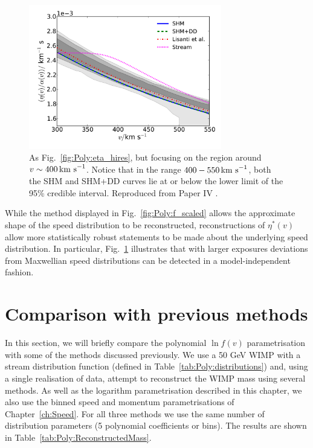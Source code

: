 \begin{figure}[t]
\centering
  \includegraphics[width=0.75\textwidth]{Poly/LIS_hires_zoom.pdf}
  \caption[As Fig.~\ref{fig:Poly:eta_hires}, but focusing on the region around $v \sim 400 \kms$]{As Fig.~\ref{fig:Poly:eta_hires}, but focusing on the region around $v \sim 400 \kms$. Notice that in the range $400-550 \,\textrm{km s}^{-1}$, both the SHM and SHM+DD curves lie at or below the lower limit of the 95\% credible interval. Reproduced from Paper IV \cite{Kavanagh:2014}.}
  \label{fig:Poly:eta_hires_zoom}
\end{figure}

While the method displayed in Fig.~\ref{fig:Poly:f_scaled} allows the approximate shape of the speed distribution to be reconstructed, reconstructions of $\eta^*(v)$ allow more statistically robust statements to be made about the underlying speed distribution. In particular, Fig.~\ref{fig:Poly:eta_hires_zoom} illustrates that with larger exposures deviations from Maxwellian speed distributions can be detected in a model-independent fashion.

\section{Comparison with previous methods}

In this section, we will briefly compare the polynomial $\ln f(v)$ parametrisation with some of the methods discussed previously. We use a 50 GeV WIMP with a stream distribution function (defined in Table~\ref{tab:Poly:distributions}) and, using a single realisation of data, attempt to reconstruct the WIMP mass using several methods. As well as the logarithm parametrisation described in this chapter, we also use the binned speed and momentum parametrisations of Chapter~\ref{ch:Speed}. For all three methods we use the same number of distribution parameters (5 polynomial coefficients or bins). The results are shown in Table~\ref{tab:Poly:ReconstructedMass}.

